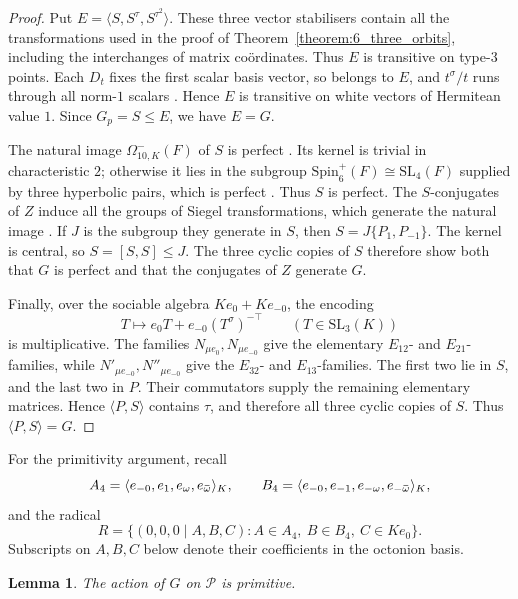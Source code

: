 \documentclass{amsart}
\def\ombb{\mathord{\mbox{\hspace*{0pt}}\;\!\overline{\!\!\:\omega\!\!\:}\;\!}\mbox{\hspace*{0pt}}}
\newcommand{\SL}{\mathrm{SL}}
\newcommand{\Spin}{\mathrm{Spin}}
\newcommand{\s}{\sigma}
\newcommand{\T}{\top}
\theoremstyle{plain}
\numberwithin{theorem}{section}
\newtheorem{lemma}[theorem]{Lemma}
\theoremstyle{definition}
\begin{document}
\begin{proof}
    Put $E=\langle S,S^\tau,S^{\tau^2}\rangle$.
    These three vector stabilisers contain all the transformations used
    in the proof of Theorem~\ref{theorem:6_three_orbits}, including the
    interchanges of matrix co\"ordinates. Thus $E$ is transitive on
    type-$3$ points. Each $D_t$ fixes the first scalar basis vector,
    so belongs to $E$, and $t^\s/t$ runs through all norm-$1$ scalars
    \cite[Lemma~10.1(iv)]{Taylor}. Hence $E$ is transitive on white
    vectors of Hermitean value $1$. Since $G_p=S\leqslant E$, we have $E=G$.

    The natural image $\Omega^-_{10,K}(F)$ of $S$ is perfect
    \cite[Theorem~11.47]{Taylor}. Its kernel is trivial in characteristic
    $2$; otherwise it lies in the subgroup
    $\Spin^+_6(F)\cong\SL_4(F)$ supplied by three hyperbolic pairs,
    which is perfect \cite[Theorem~4.4]{Taylor}. Thus $S$ is perfect.
    The $S$-conjugates of $Z$ induce all the groups of Siegel
    transformations, which generate the natural image
    \cite[Theorem~11.46]{Taylor}. If $J$ is the subgroup they generate
    in $S$, then $S=J\{P_1,P_{-1}\}$. The kernel is central, so
    $S=[S,S]\leqslant J$. The three cyclic copies of $S$ therefore
    show both that $G$ is perfect and that the conjugates of $Z$ generate $G$.

    Finally, over the sociable algebra $Ke_0+Ke_{-0}$, the encoding
    \[
        T\longmapsto e_0T+e_{-0}(T^\s)^{-\T}
        \qquad(T\in\SL_3(K))
    \]
    is multiplicative. The families $N_{\mu e_0},N_{\mu e_{-0}}$
    give the elementary $E_{12}$- and $E_{21}$-families, while
    $N'_{\mu e_{-0}},N''_{\mu e_{-0}}$ give the $E_{32}$- and
    $E_{13}$-families. The first two lie in $S$, and the last two in $P$.
    Their commutators supply the remaining elementary matrices.
    Hence $\langle P,S\rangle$ contains $\tau$, and therefore all
    three cyclic copies of $S$. Thus $\langle P,S\rangle=G$.
\end{proof}

For the primitivity argument, recall
\[
    A_4=\langle e_{-0},e_1,e_\omega,e_{\ombb}\rangle_K,\qquad
    B_4=\langle e_{-0},e_{-1},e_{-\omega},e_{-\ombb}\rangle_K,
\]
and the radical
\[
    R=\{(0,0,0\mid A,B,C):A\in A_4,\ B\in B_4,\ C\in Ke_0\}.
\]
Subscripts on $A,B,C$ below denote their coefficients in the octonion basis.

\begin{lemma}
    \label{lemma:simplicity_primitive}
    The action of $G$ on $\mathcal P$ is primitive.
\end{lemma}
\end{document}
